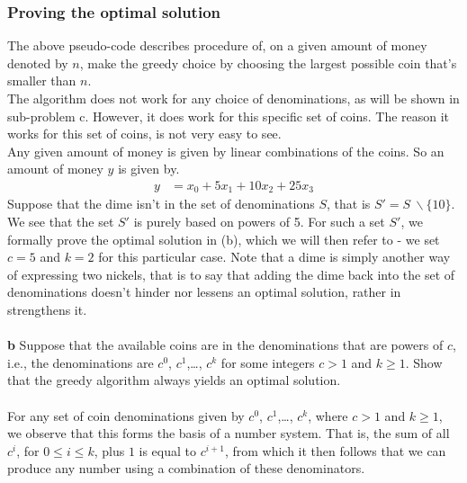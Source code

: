\documentclass[11pt,english]{article}
\begin{document}
\subsubsection*{Proving the optimal solution}
\noindent The above pseudo-code describes procedure of, on a given amount 
of money denoted by $n$, make the greedy choice by choosing the largest 
possible coin that's smaller than $n$. \\
The algorithm does not work for any choice of denominations, as will be 
shown in sub-problem c. However, it does work for this specific set of 
coins. The reason it works for this set of coins, is not very easy to 
see. \\
Any given amount of money is given by linear combinations of the coins. 
So an amount of money $y$ is given by.
\begin{align*}
y &= x_0 + 5x_1 + 10x_2 +25x_3
\end{align*}
Suppose that the dime isn't in the set of denominations $S$, that is $S' =
S{\ }\backslash \{10\}$. We see that the set $S'$ is purely based on powers
of 5. For such a set $S'$, we formally prove the optimal solution in (b),
which we will then refer to - we set $c=5$ and $k=2$ for this particular case.
Note that a dime is simply another way of expressing two nickels, that is to
say that adding the dime back into the set of denominations doesn't hinder
nor lessens an optimal solution, rather in strengthens it.
\\\\
\noindent \large{\textbf{b} Suppose that the available coins are in the
denominations that are powers of $c$, i.e., the denominations are $c^0$,
$c^1$,\dots, $c^k$ for some integers $c > 1$ and $k \geq 1$. Show that
the greedy algorithm always yields an optimal solution.}
\\\\
For any set of coin denominations given by $c^0$, $c^1$,\dots, $c^k$, where
$c > 1$ and $k \geq 1$, we observe that this forms the basis of a number
system. That is, the sum of all $c^i$, for $0 \leq i \leq k$, plus $1$ is
equal to $c^{i+1}$, from which it then follows that we can produce any number
using a combination of these denominators.
\end{document}
